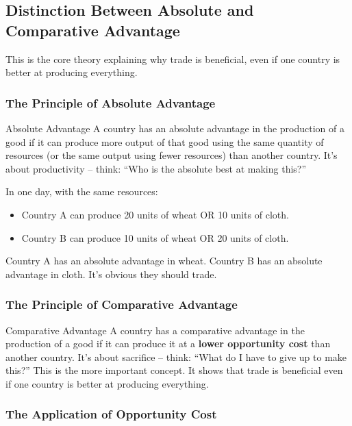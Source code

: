 \documentclass[11pt, a4paper, twoside]{book}
\begin{document}
\subsection{Distinction Between Absolute and Comparative Advantage}

This is the core theory explaining why trade is beneficial, even if one country is better at producing everything.

\subsubsection{The Principle of Absolute Advantage}

\begin{keyterm}{Absolute Advantage}
A country has an absolute advantage in the production of a good if it can produce more output of that good using the same quantity of resources (or the same output using fewer resources) than another country. It's about productivity -- think: ``Who is the absolute best at making this?''
\end{keyterm}

\begin{example}
In one day, with the same resources:
\begin{itemize}
  \item Country A can produce 20 units of wheat OR 10 units of cloth.
  \item Country B can produce 10 units of wheat OR 20 units of cloth.
\end{itemize}
Country A has an absolute advantage in wheat. Country B has an absolute advantage in cloth. It's obvious they should trade.
\end{example}

\subsubsection{The Principle of Comparative Advantage}

\begin{keyterm}{Comparative Advantage}
A country has a comparative advantage in the production of a good if it can produce it at a \textbf{lower opportunity cost} than another country. It's about sacrifice -- think: ``What do I have to give up to make this?'' This is the more important concept. It shows that trade is beneficial even if one country is better at producing everything.
\end{keyterm}

\subsubsection{The Application of Opportunity Cost}
\end{document}
